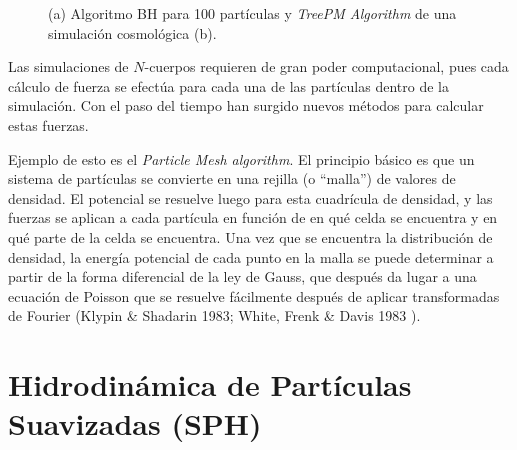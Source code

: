 \documentclass[a4paper,openright,10pt, oneside, final]{book}
\begin{document}
\begin{figure}
\centering
  \caption{\footnotesize{(a) Algoritmo BH para 100 partículas y \textit{TreePM Algorithm} de una simulación cosmológica (b).}}
  \label{fig 2.1}
\end{figure}

Las simulaciones de $N$-cuerpos requieren de gran poder computacional, pues cada cálculo de fuerza se efectúa para cada una de las partículas dentro de la simulación. Con el paso del tiempo han surgido nuevos métodos para calcular estas fuerzas. 

Ejemplo de esto es el \textit{Particle Mesh algorithm}. El principio básico es que un sistema de partículas se convierte en una rejilla (o ``malla'') de valores de densidad. El potencial se resuelve luego para esta cuadrícula de densidad, y las fuerzas se aplican a cada partícula en función de en qué celda se encuentra y en qué parte de la celda se encuentra. Una vez que se encuentra la distribución de densidad, la energía potencial de cada punto en la malla se puede determinar a partir de la forma diferencial de la ley de Gauss, que después da lugar a una ecuación de Poisson que se resuelve fácilmente después de aplicar transformadas de Fourier (Klypin \& Shadarin 1983; White, Frenk \& Davis 1983 \cite{b5.1, b5.2}).




\section{Hidrodinámica de Partículas Suavizadas (SPH)}
\end{document}
